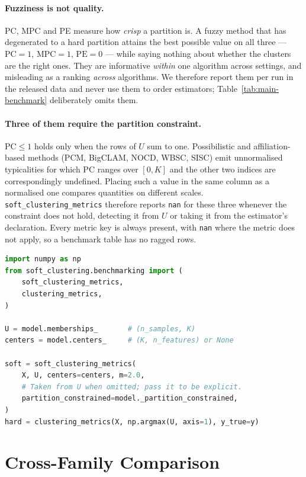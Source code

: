 \documentclass[twoside,11pt]{article}
\begin{document}
\paragraph{Fuzziness is not quality.} PC, MPC and PE measure how \emph{crisp}
a partition is. A fuzzy method that has degenerated to a hard partition
attains the best possible value on all three --- $\mathrm{PC}=1$,
$\mathrm{MPC}=1$, $\mathrm{PE}=0$ --- while saying nothing about whether the
clusters are the right ones. They are informative \emph{within} one algorithm
across settings, and misleading as a ranking \emph{across} algorithms. We
therefore report them per run in the released data and never use them to
order estimators; Table~\ref{tab:main-benchmark} deliberately omits them.

\paragraph{Three of them require the partition constraint.}
$\mathrm{PC} \le 1$ holds only when the rows of $U$ sum to one.
Possibilistic and affiliation-based methods (PCM, BigCLAM, NOCD, WBSC, SISC)
emit unnormalised typicalities for which PC ranges over $[0, K]$ and the
other two indices are correspondingly undefined. Placing such a value in the
same column as a normalised one compares quantities on different scales.
\texttt{soft\_clustering\_metrics} therefore reports \texttt{nan} for these
three whenever the constraint does not hold, detecting it from $U$ or taking
it from the estimator's declaration. Every metric key is always present, with
\texttt{nan} where the metric does not apply, so a benchmark table has no
ragged rows.

\begin{lstlisting}[language=Python, caption={Computing all metrics for a fitted model.}]
import numpy as np
from soft_clustering.benchmarking import (
    soft_clustering_metrics,
    clustering_metrics,
)

U = model.memberships_       # (n_samples, K)
centers = model.centers_     # (K, n_features) or None

soft = soft_clustering_metrics(
    X, U, centers=centers, m=2.0,
    # Taken from U when omitted; pass it to be explicit.
    partition_constrained=model._partition_constrained,
)
hard = clustering_metrics(X, np.argmax(U, axis=1), y_true=y)
\end{lstlisting}

\section{Cross-Family Comparison}\label{app:performance}
\end{document}
